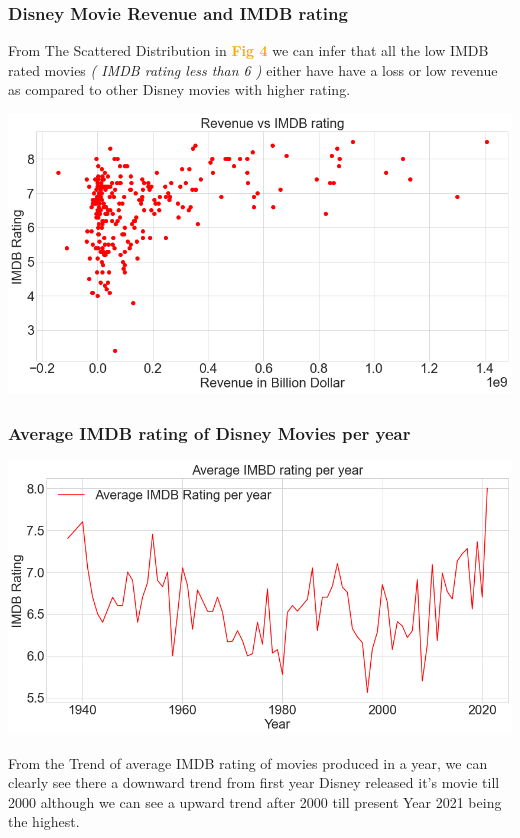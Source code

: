 \documentclass{article}
\begin{document}
\subsubsection{Disney Movie Revenue and IMDB rating}

\noindent
\begin{minipage}{0.55\textwidth}
From The Scattered Distribution in \textbf{\textcolor{Orange}{Fig 4}}  we can infer that all the low  IMDB  rated movies\textit{ ( IMDB rating less than 6 )} either have have a loss or low revenue as compared to other Disney movies with higher rating.
\end{minipage}\hfill%
\begin{minipage}{0.4\textwidth}
\includegraphics[width=\linewidth]{figures/13.png}
 \textcolor{Orange}{\textbf{}}
\end{minipage}%


\subsubsection{Average IMDB rating of Disney Movies  per year}

\noindent\begin{minipage}{0.4\textwidth}
\includegraphics[width=\linewidth]{figures/14.png}
\textcolor{Orange}{\textbf{}}
\end{minipage}%
\hfill%
\begin{minipage}{0.4\textwidth}
From the Trend of average IMDB rating of movies produced in a year, we can clearly see there a downward trend from first year Disney released it's movie till 2000 although we can see a upward trend after 2000  till present Year 2021 being the highest.
\end{minipage}
\end{document}
